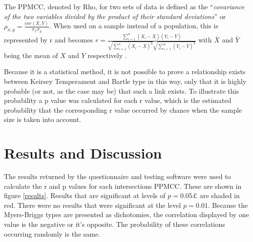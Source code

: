 \documentclass[12pt,a4paper,twoside]{report}
\begin{document}
The PPMCC, denoted by Rho, for two sets of data is defined as the ``\textit{covariance of the two variables divided by the product of their standard deviations}'' \cite{wiki-ppmcc} or $\rho_{x,y}=\frac{cov(X,Y)}{\sigma_x \sigma_y}$. When used on a sample instead of a population, this is represented by r and becomes $r=\frac{\sum_{i=1}^{n}(X_i-\bar{X})(Y_i-\bar{Y})}{\sqrt{\sum_{i=1}^{n}(X_i-\bar{X})^2}\sqrt{\sum_{i=1}^{n}(Y_i-\bar{Y})^2}}$ with $\bar{X}$ and $\bar{Y}$ being the mean of $X$ and $Y$ respectively \cite{pearson1895note}. 

\vspace{0.1cm}
Because it is a statistical method, it is not possible to prove a relationship exists between Keirsey Temperament and Bartle type in this way, only that it is highly probable (or not, as the case may be) that such a link exists. To illustrate this probability a p value was calculated for each r value, which is the estimated probability that the corresponding r value occurred by chance when the sample size is taken into account.

\section{Results and Discussion}
The results returned by the questionnaire and testing software were used to calculate the r and p values for each intersections PPMCC. These are shown in figure \ref{results}. Results that are significant at levels of $p = 0.05£$ are shaded in red. There were no results that were significant at the level $p = 0.01$. Because the Myers-Briggs types are presented as dichotomies, the correlation displayed by one value is the negative or it's opposite. The probability of these correlations occurring randomly is the same.
\end{document}
